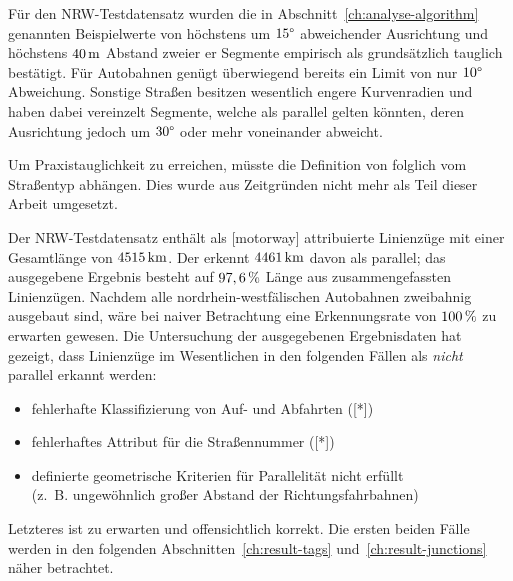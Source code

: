 \documentclass[../main/thesis.tex]{subfiles}
\begin{document}
Für den NRW-Testdatensatz wurden die in Abschnitt~\ref{ch:analyse-algorithm} genannten Beispielwerte von höchstens um $15\degree$ abweichender Ausrichtung und höchstens $\unit[40]{m}$ Abstand zweier er Segmente empirisch als grundsätzlich tauglich bestätigt.
Für Autobahnen genügt überwiegend bereits ein Limit von nur $10\degree$ Abweichung.
Sonstige Straßen besitzen wesentlich engere Kurvenradien und haben dabei vereinzelt Segmente, welche als parallel gelten könnten, deren Ausrichtung jedoch um $30\degree$ oder mehr voneinander abweicht.



Um Praxistauglichkeit zu erreichen, müsste die Definition von  folglich vom Straßentyp abhängen.
Dies wurde aus Zeitgründen nicht mehr als Teil dieser Arbeit umgesetzt.

Der NRW-Testdatensatz enthält als [motorway] attribuierte Linienzüge mit einer Gesamtlänge von $\unit[4515]{km}$.
Der  erkennt $\unit[4461]{km}$ davon als parallel; das ausgegebene Ergebnis besteht auf $\unit[97,6]{\%}$ Länge aus zusammengefassten Linienzügen.
Nachdem alle nordrhein-westfälischen Autobahnen zweibahnig ausgebaut sind, wäre bei naiver Betrachtung eine Erkennungsrate von $\unit[100]{\%}$ zu erwarten gewesen.
Die Untersuchung der ausgegebenen Ergebnisdaten hat gezeigt, dass Linienzüge im Wesentlichen in den folgenden Fällen als \emph{nicht} parallel erkannt werden:

\begin{itemize}[nosep]
\item fehlerhafte Klassifizierung von Auf- und Abfahrten ([*])
\item fehlerhaftes Attribut für die Straßennummer ([*])
\item definierte geometrische Kriterien für Parallelität nicht erfüllt \\(z.~B. ungewöhnlich großer Abstand der Richtungsfahrbahnen)
\end{itemize}
%
Letzteres ist zu erwarten und offensichtlich korrekt.
Die ersten beiden Fälle werden in den folgenden Abschnitten~\ref{ch:result-tags} und~\ref{ch:result-junctions} näher betrachtet.
\end{document}
